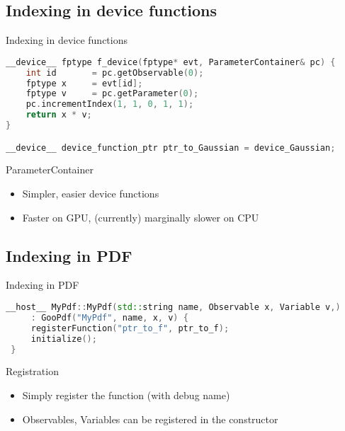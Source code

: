 \documentclass[aspectratio=169, smaller]{beamer}
\begin{document}
\subsection{Indexing in device functions}
\begin{frame}[fragile]{Indexing in device functions}
\begin{lstlisting}[language=C++]
__device__ fptype f_device(fptype* evt, ParameterContainer& pc) {
    int id       = pc.getObservable(0);
    fptype x     = evt[id];
    fptype v     = pc.getParameter(0);
    pc.incrementIndex(1, 1, 0, 1, 1);
    return x * v;
}

__device__ device_function_ptr ptr_to_Gaussian = device_Gaussian;
\end{lstlisting}

\begin{block}{ParameterContainer}
    \begin{itemize}
        \item Simpler, easier device functions
        \item Faster on GPU, (currently) marginally slower on CPU
    \end{itemize}
\end{block}
\end{frame}

\subsection{Indexing in PDF}
\begin{frame}[fragile]{Indexing in PDF}
\begin{lstlisting}[language=C++]
 __host__ MyPdf::MyPdf(std::string name, Observable x, Variable v,)
     : GooPdf("MyPdf", name, x, v) {
     registerFunction("ptr_to_f", ptr_to_f);
     initialize();
 }
\end{lstlisting}

\begin{block}{Registration}
    \begin{itemize}
        \item Simply register the function (with debug name)
        \item Observables, Variables can be registered in the constructor
    \end{itemize}
\end{block}
\end{frame}

\end{document}
